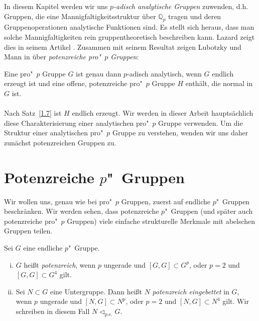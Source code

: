\documentclass[11pt,a4paper,openany]{memoir}
\begin{document}
In diesem Kapitel werden wir uns \textit{$p$-adisch analytische Gruppen} zuwenden, d.h. Gruppen, die eine Mannigfaltigkeitsstruktur über $\mathbb{Q}_p$ tragen und deren Gruppenoperationen analytische Funktionen sind. Es stellt sich heraus, dass man solche Mannigfaltigkeiten rein gruppentheoretisch beschreiben kann. Lazard zeigt dies in seinem Artikel \cite{Laz65}. Zusammen mit seinem Resultat zeigen Lubotzky und Mann in \cite{LM87} über \textit{potenzreiche pro"~$p$ Gruppen}:

\begin{theorem}\label{thm:analytische-pro-p-gruppe}
Eine pro"~$p$ Gruppe $G$ ist genau dann $p$-adisch analytisch, wenn $G$ endlich erzeugt ist und eine offene, potenzreiche pro"~$p$ Gruppe $H$ enthält, die normal in $G$ ist.
\end{theorem}

\paragraph{} Nach Satz~\ref{1.7} ist $H$ endlich erzeugt. Wir werden in dieser Arbeit hauptsächlich diese Charakterisierung einer analytischen pro"~$p$ Gruppe verwenden. Um die Struktur einer analytischen pro"~$p$ Gruppe zu verstehen, wenden wir uns daher zunächst potenzreichen Gruppen zu.

\section{Potenzreiche $p$"~Gruppen}

Wir wollen uns, genau wie bei pro"~$p$ Gruppen, zuerst auf endliche $p$"~Gruppen beschränken. Wir werden sehen, dass potenzreiche $p$"~Gruppen (und später auch potenzreiche pro"~$p$ Gruppen) viele einfache strukturelle Merkmale mit abelschen Gruppen teilen.

\begin{definition}
Sei $G$ eine endliche $p$"~Gruppe.
\begin{enumerate}[(i)]
\item $G$ heißt \textit{potenzreich}, wenn $p$ ungerade und $[G,G]\subset G^p$, oder $p=2$ und $[G,G]\subset G^4$ gilt.
\item Sei $N\subset G$ eine Untergruppe. Dann heißt $N$ \textit{potenzreich eingebettet} in $G$, wenn $p$ ungerade und $[N,G]\subset N^p$, oder $p=2$ und $[N,G]\subset N^4$ gilt. Wir schreiben in diesem Fall $N\lhd_\text{p.e.}G$.
\end{enumerate}
\end{definition}
\end{document}
